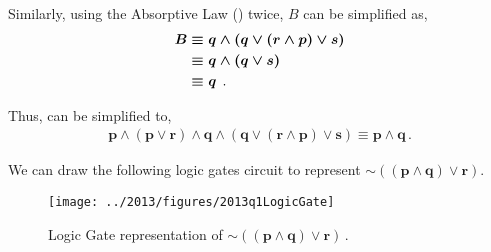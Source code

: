 \begin{subquestions}
\begin{subsubquestions}
Similarly, using the Absorptive Law () twice, $B$ can be simplified as,
\begin{align}
	\boldsymbol{B} & \boldsymbol{\equiv q \land (q \lor (r \land p) \lor s)} \nonumber \\
	  & \boldsymbol{\equiv q \land (q \lor s)} \nonumber \\
	  & \boldsymbol{\equiv q} \,.
\end{align}

Thus,  can be simplified to,
\begin{align}
	\boldsymbol{p \land (p \lor r) \land q \land (q \lor (r \land p) \lor s) \equiv p \land q} \,.
\end{align}

\end{subsubquestions}


\subquestion

We can draw the following logic gates circuit to represent $\boldsymbol{\sim((p \land q) \lor r)}$.
\begin{figure}[H]
	\begin{center}
		\texttt{[image: ../2013/figures/2013q1LogicGate]}
		\caption{\label{2013:q1:fig:LogicGates} Logic Gate representation of $\boldsymbol{\sim((p \land q) \lor r)}$\,.}
	\end{center}
\end{figure}

\end{subquestions}

